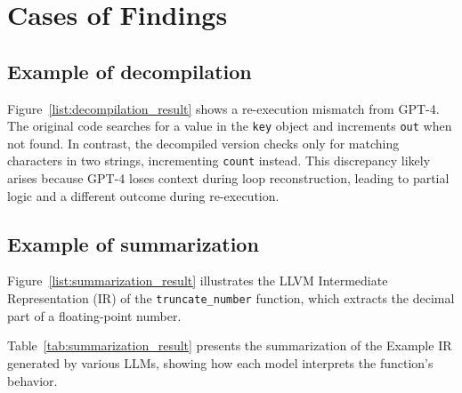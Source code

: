 \section{Cases of Findings}
\label{sec:appendix:cases_study}
\subsection{Example of decompilation}
\label{subsec:appendix:decompilation_example}
Figure~\ref{list:decompilation_result} shows a re-execution mismatch from GPT-4. The original code searches for a value in the \texttt{key} object and increments \texttt{out} when not found. In contrast, the decompiled version checks only for matching characters in two strings, incrementing \texttt{count} instead. This discrepancy likely arises because GPT-4 loses context during loop reconstruction, leading to partial logic and a different outcome during re-execution.


\subsection{Example of summarization}

\label{subsec:appendix:summarization_example}
Figure~\ref{list:summarization_result} illustrates the LLVM Intermediate Representation (IR) of the \texttt{truncate\_number} function, which extracts the decimal part of a floating-point number.

Table~\ref{tab:summarization_result} presents the summarization of the Example IR generated by various LLMs, showing how each model interprets the function's behavior.



